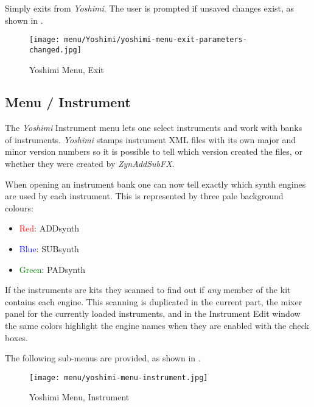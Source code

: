    Simply exits from \textsl{Yoshimi}.
   The user is prompted if unsaved changes exist, as shown in
   .

\begin{figure}[H]
   \centering 
   \texttt{[image: menu/Yoshimi/yoshimi-menu-exit-parameters-changed.jpg]}
   \caption[Yoshimi Menu, Exit]{Yoshimi Menu, Exit}
   \label{fig:yoshimi_change_exit}
\end{figure}

\subsection{Menu / Instrument}
\label{subsec:menu_instrument}

   The \textsl{Yoshimi} Instrument menu lets one select instruments and work
   with banks of instruments.
   \textsl{Yoshimi} stamps instrument XML files with its own major and minor
   version numbers so it is possible to tell which version created the files,
   or whether they were created by \textsl{ZynAddSubFX}.

   When opening an instrument bank one can now tell exactly which synth engines
   are used by each instrument. This is represented by three pale background
   colours:

   \begin{itemize}
      \item \textcolor{red}{Red}: ADDsynth
      \item \textcolor{blue}{Blue}: SUBsynth
      \item \textcolor{green}{Green}: PADsynth
   \end{itemize}

   If the instruments are kits they scanned to find out if 
   \textsl{any} member of the kit contains each engine.
   This scanning is duplicated in the current part, the mixer panel for the
   currently loaded instruments, and in the Instrument Edit window the same
   colors highlight the engine names when they are enabled with the check
   boxes. 

   The following sub-menus are provided, as shown in
   .

\begin{figure}[H]
   \centering 
   \texttt{[image: menu/yoshimi-menu-instrument.jpg]}
   \caption{Yoshimi Menu, Instrument}
   \label{fig:yoshimi_instrument_menu}
\end{figure}

